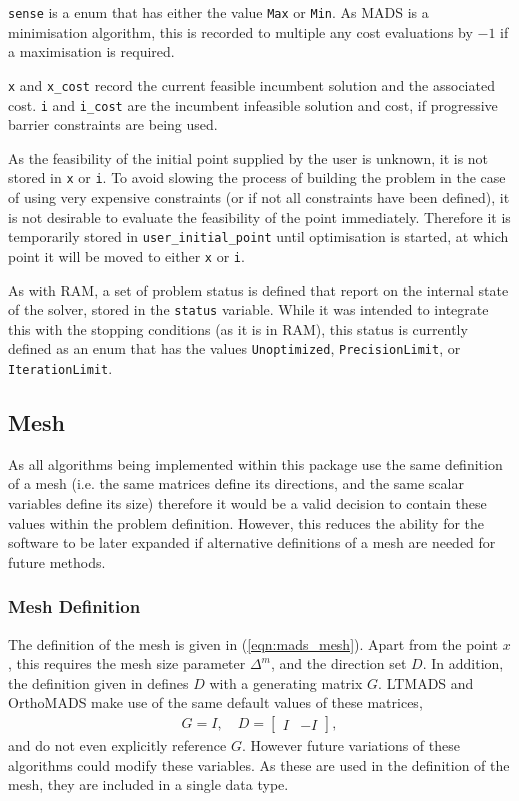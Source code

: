 

\texttt{sense} is a enum that has either the value \texttt{Max} or \texttt{Min}. As MADS is a minimisation algorithm, this is recorded to multiple any cost evaluations by $-1$ if a maximisation is required.

\texttt{x} and \texttt{x\_cost} record the current feasible incumbent solution and the associated cost. \texttt{i} and \texttt{i\_cost} are the incumbent infeasible solution and cost, if progressive barrier constraints are being used.

As the feasibility of the initial point supplied by the user is unknown, it is not stored in \texttt{x} or \texttt{i}. To avoid slowing the process of building the problem in the case of using very expensive constraints (or if not all constraints have been defined), it is not desirable to evaluate the feasibility of the point immediately. Therefore it is temporarily stored in \texttt{user\_initial\_point} until optimisation is started, at which point it will be moved to either \texttt{x} or \texttt{i}.

As with RAM, a set of problem status is defined that report on the internal state of the solver, stored in the \texttt{status} variable. While it was intended to integrate this with the stopping conditions (as it is in RAM), this status is currently defined as an enum that has the values \texttt{Unoptimized}, \texttt{PrecisionLimit}, or \texttt{IterationLimit}.

\subsection{Mesh}
As all algorithms being implemented within this package use the same definition of a mesh (i.e. the same matrices define its directions, and the same scalar variables define its size) therefore it would be a valid decision to contain these values within the problem definition. However, this reduces the ability for the software to be later expanded if alternative definitions of a mesh are needed for future methods.

\subsubsection{Mesh Definition}
The definition of the mesh is given in (\ref{eqn:mads_mesh}). Apart from the point $x$, this requires the mesh size parameter $\Delta^m$, and the direction set $D$. In addition, the definition given in \cite{Audet2007MeshOptimization} defines $D$ with a generating matrix $G$. LTMADS and OrthoMADS make use of the same default values of these matrices, 
\begin{align}
    G = I, \quad D = \begin{bmatrix}  I & -I \end{bmatrix},
\end{align}
and do not even explicitly reference $G$. However future variations of these algorithms could modify these variables. As these are used in the definition of the mesh, they are included in a single data type.

